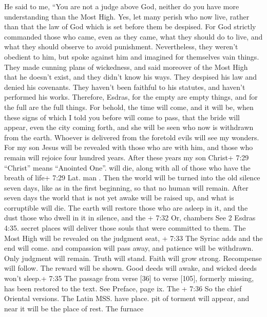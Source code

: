  He said to me, ``You are not a judge above God, neither do
you have more understanding than the Most High.  Yes, let
many perish who now live, rather than that the law of God which is set
before them be despised.  For God strictly commanded those
who came, even as they came, what they should do to live, and what they
should observe to avoid punishment.  Nevertheless, they
weren't obedient to him, but spoke against him and imagined for
themselves vain things.  They made cunning plans of
wickedness, and said moreover of the Most High that he doesn't exist,
and they didn't know his ways.  They despised his law and
denied his covenants. They haven't been faithful to his statutes, and
haven't performed his works.  Therefore, Esdras, for the
empty are empty things, and for the full are the full things.
 For behold, the time will come, and it will be, when these
signs of which I told you before will come to pass, that the bride will
appear, even the city coming forth, and she will be seen who now is
withdrawn from the earth.  Whoever is delivered from the
foretold evils will see my wonders.  For my son Jesus will
be revealed with those who are with him, and those who remain will
rejoice four hundred years.  After these years my son
Christ+ 7:29 ``Christ'' means ``Anointed One''. will die, along with all
of those who have the breath of life+ 7:29 Lat. man .  Then
the world will be turned into the old silence seven days, like as in the
first beginning, so that no human will remain.  After seven
days the world that is not yet awake will be raised up, and what is
corruptible will die.  The earth will restore those who are
asleep in it, and the dust those who dwell in it in silence, and the +
7:32 Or, chambers See 2 Esdras 4:35. secret places will deliver those
souls that were committed to them.  The Most High will be
revealed on the judgment seat, + 7:33 The Syriac adds and the end will
come. and compassion will pass away, and patience will be withdrawn.
 Only judgment will remain. Truth will stand. Faith will
grow strong.  Recompense will follow. The reward will be
shown. Good deeds will awake, and wicked deeds won't sleep.+ 7:35 The
passage from verse {[}36{]} to verse {[}105{]}, formerly missing, has
been restored to the text. See Preface, page ix.  The +
7:36 So the chief Oriental versions. The Latin MSS. have place. pit of
torment will appear, and near it will be the place of rest. The furnace
